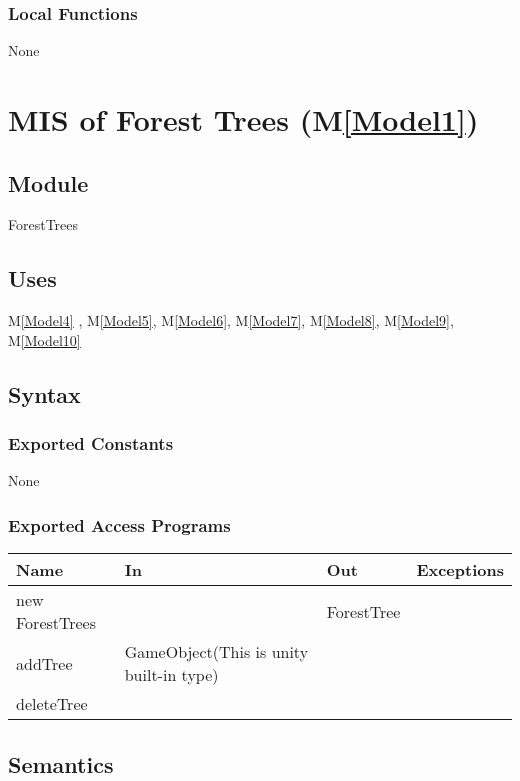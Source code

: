 \documentclass[12pt, titlepage]{article}
\newcommand{\mref}[1]{M\ref{#1}}
\begin{document}
\subsubsection{Local Functions}
None

\newpage

\section{MIS of Forest Trees (\mref{Model1})} 

\subsection{Module}
ForestTrees

\subsection{Uses}
\mref{Model4} , \mref{Model5}, 
\mref{Model6}, \mref{Model7}, 
\mref{Model8}, \mref{Model9},
\mref{Model10}

\subsection{Syntax}

\subsubsection{Exported Constants}
None

\subsubsection{Exported Access Programs}
\begin{center}
\begin{tabular}{|p{3cm}|p{4cm}|p{4cm}| p{5cm}|}
\hline
\textbf{Name} & \textbf{In} & \textbf{Out} & \textbf{Exceptions} \\
\hline
new ForestTrees & & ForestTree & \\
\hline
addTree & GameObject(This is unity built-in type) & & \\ 
\hline
deleteTree & & & \\
\hline
\end{tabular}
\end{center}

\subsection{Semantics}
\end{document}
